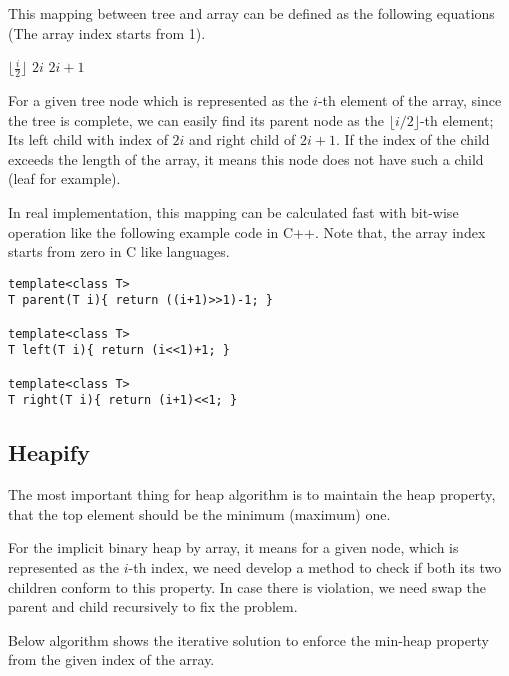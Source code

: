 \documentclass{article}
\begin{document}
This mapping between tree and array can be defined as
the following equations (The array index starts from 1).

\begin{algorithmic}[1]
  \State \Return $\lfloor \frac{i}{2} \rfloor$
\EndFunction
\Statex
{}
  \State \Return $2i$
\EndFunction
\Statex
{}
  \State \Return $2i+1$
\EndFunction
\end{algorithmic}

For a given tree node which is represented as the $i$-th element of the
array, since the tree is complete, we can easily find its parent node
as the $\lfloor i/2 \rfloor$-th element; Its left child
with index of $2i$ and right child of $2i+1$. If the index
of the child exceeds the length of the array, it means this
node does not have such a child (leaf for example).

In real implementation, this mapping can be calculated fast
with bit-wise operation like the following example code in C++.
Note that, the array index starts from zero in C like
languages.

\lstset{language=C++}
\begin{lstlisting}
template<class T>
T parent(T i){ return ((i+1)>>1)-1; }

template<class T>
T left(T i){ return (i<<1)+1; }

template<class T>
T right(T i){ return (i+1)<<1; }
\end{lstlisting}

\subsection{Heapify}

The most important thing for heap algorithm is to maintain the heap
property, that the top element should be the minimum (maximum) one.

For the implicit binary heap by array, it means for a given node,
which is represented as the $i$-th index, we need develop a method
to check if both its two children conform to this property. In case
there is violation, we need swap the parent and child recursively \cite{CLRS}
to fix the problem.

Below algorithm shows the iterative solution to enforce the min-heap
property from the given index of the array.
\end{document}
